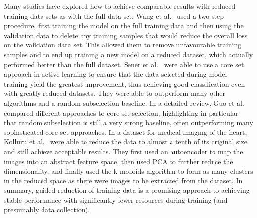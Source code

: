 Many studies have explored how to achieve comparable results with reduced training data sets as with the full data set. Wang et al.~\cite{wangDataDropoutOptimizing2018} used a two-step procedure, first training the model on the full training data and then using the validation data to delete any training samples that would reduce the overall loss on the validation data set. This allowed them to remove unfavourable training samples and to end up training a new model on a reduced dataset, which actually performed better than the full dataset. Sener et al.~\cite{senerActiveLearningConvolutional2018} were able to use a core set approach in active learning to ensure that the data selected during model training yield the greatest improvement, thus achieving good classification even with greatly reduced datasets. They were able to outperform many other algorithms and a random subselection baseline. In a detailed review, Guo et al.~\cite{guoDeepCoreComprehensiveLibrary2022} compared different approaches to core set selection, highlighting in particular that random subselection is still a very strong baseline, often outperforming many sophisticated core set approaches. In a dataset for medical imaging of the heart, Kolluru et al.~\cite{kolluruLearningFewerImages2021} were able to reduce the data to almost a tenth of its original size and still achieve acceptable results. They first used an autoencoder to map the images into an abstract feature space, then used PCA to further reduce the dimensionality, and finally used the k-medoids algorithm to form as many clusters in the reduced space as there were images to be extracted from the dataset. In summary, guided reduction of training data is a promising approach to achieving stable performance with significantly fewer resources during training (and presumably data collection).

